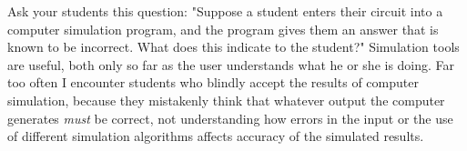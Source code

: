 Ask your students this question: "Suppose a student enters their circuit into a computer simulation program, and the program gives them an answer that is known to be incorrect.  What does this indicate to the student?"  Simulation tools are useful, both only so far as the user understands what he or she is doing.  Far too often I encounter students who blindly accept the results of computer simulation, because they mistakenly think that whatever output the computer generates {\it must} be correct, not understanding how errors in the input or the use of different simulation algorithms affects accuracy of the simulated results.



